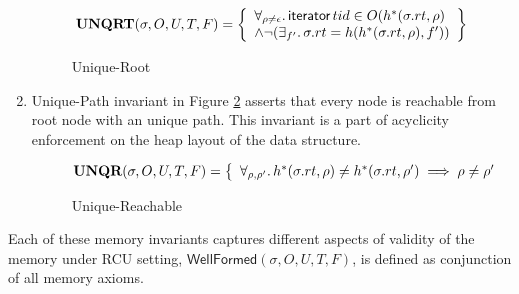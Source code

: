 \begin{enumerate}
  \begin{figure}[!htb]
\[
\textbf{UNQRT}(\sigma,O,U,T,F) =
  \left\{ \begin{array}{ll}
    \forall_{\rho \neq \epsilon} \ldotp \textsf{iterator} \, tid \in O( h^{*}(\sigma.rt,\rho)\\
    \land \lnot(\exists_{f'} \ldotp \sigma.rt = h( h^{*}(\sigma.rt,\rho),f'))
\end{array} \right\}
\]
    \caption{Unique-Root}
\label{fig:uroot}
\end{figure}
\item{Unique-Path} invariant in Figure \ref{fig:upath} asserts that every node is reachable from root node with an unique path. This invariant is a part of acyclicity enforcement on the heap layout of the data structure.
  \begin{figure}[!htb]
\[
\textbf{UNQR}(\sigma,O,U,T,F) =
\left\{
\begin{array}{ll}
    \forall_{\rho, \rho'}  \ldotp  h^{*}(\sigma.rt,\rho) \neq h^{*}(\sigma.rt, \rho') \implies  \rho \neq \rho' 
\end{array}
\right.%
\]
\caption{Unique-Reachable}
\label{fig:upath}
\end{figure}
\end{enumerate}
 Each of these memory invariants captures different aspects of validity of the memory under \textsf{RCU} setting, $\textsf{WellFormed}(\sigma,O,U,T,F) $, is defined as conjunction of all memory axioms.

